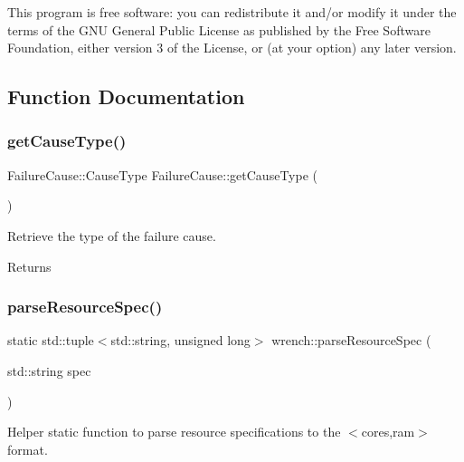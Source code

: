 This program is free software\+: you can redistribute it and/or modify it under the terms of the G\+NU General Public License as published by the Free Software Foundation, either version 3 of the License, or (at your option) any later version. 

\subsection{Function Documentation}
\mbox{\label{namespacewrench_aa48af8274224242d74259631a6b6b23a}} 
\subsubsection{\texorpdfstring{get\+Cause\+Type()}{getCauseType()}}
{\footnotesize\ttfamily Failure\+Cause\+::\+Cause\+Type Failure\+Cause\+::get\+Cause\+Type (\begin{DoxyParamCaption}{ }\end{DoxyParamCaption})}



Retrieve the type of the failure cause. 

\begin{DoxyReturn}{Returns}

\end{DoxyReturn}
\mbox{\label{namespacewrench_a9601a7728120192951232d2e0a74a483}} 
\subsubsection{\texorpdfstring{parse\+Resource\+Spec()}{parseResourceSpec()}}
{\footnotesize\ttfamily static std\+::tuple$<$std\+::string, unsigned long$>$ wrench\+::parse\+Resource\+Spec (\begin{DoxyParamCaption}\item[{std\+::string}]{spec }\end{DoxyParamCaption})\hspace{0.3cm}{\ttfamily [static]}}



Helper static function to parse resource specifications to the $<$cores,ram$>$ format. 


